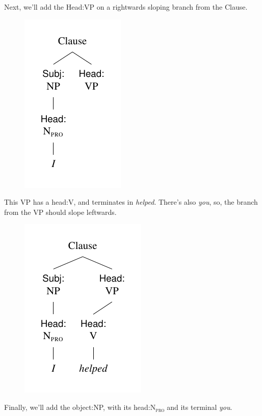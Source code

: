 Next, we'll add the Head:VP on a rightwards sloping branch from the Clause.

\begin{figure}[H]
    \centering
    \includegraphics{figures/ihadmybreakfast4.pdf}
    \label{fig:breakfast4}
\end{figure}

This VP has a head:V, and terminates in \textit{helped}. There's also \textit{you}, so, the branch from the VP should slope leftwards.

\begin{figure}[H]
    \centering
    \includegraphics{figures/ihadmybreakfast5.pdf}
    \label{fig:breakfast5}
\end{figure}

Finally, we'll add the object:NP, with its head:N\textsubscript{\textsc{pro}} and its terminal \textit{you}.

